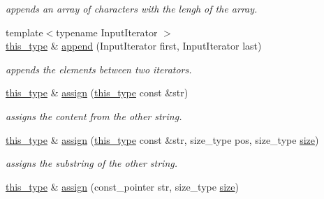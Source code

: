 \begin{DoxyCompactItemize}
\begin{DoxyCompactList}\small\item\em appends an array of characters with the lengh of the array. \end{DoxyCompactList}\item 
\hypertarget{classhryky_1_1_string_a6ef06ff34990a702f16c422d8080e40d}{{\footnotesize template$<$typename Input\-Iterator $>$ }\\\hyperlink{classhryky_1_1_string}{this\-\_\-type} \& \hyperlink{classhryky_1_1_string_a6ef06ff34990a702f16c422d8080e40d}{append} (Input\-Iterator first, Input\-Iterator last)}\label{classhryky_1_1_string_a6ef06ff34990a702f16c422d8080e40d}

\begin{DoxyCompactList}\small\item\em appends the elements between two iterators. \end{DoxyCompactList}\item 
\hypertarget{classhryky_1_1_string_a7bf5bd2385beb66a4d7d034eae00b9b1}{\hyperlink{classhryky_1_1_string}{this\-\_\-type} \& \hyperlink{classhryky_1_1_string_a7bf5bd2385beb66a4d7d034eae00b9b1}{assign} (\hyperlink{classhryky_1_1_string}{this\-\_\-type} const \&str)}\label{classhryky_1_1_string_a7bf5bd2385beb66a4d7d034eae00b9b1}

\begin{DoxyCompactList}\small\item\em assigns the content from the other string. \end{DoxyCompactList}\item 
\hypertarget{classhryky_1_1_string_a15549f6cd3f2a7957fc4d09d2ee1a346}{\hyperlink{classhryky_1_1_string}{this\-\_\-type} \& \hyperlink{classhryky_1_1_string_a15549f6cd3f2a7957fc4d09d2ee1a346}{assign} (\hyperlink{classhryky_1_1_string}{this\-\_\-type} const \&str, size\-\_\-type pos, size\-\_\-type \hyperlink{classhryky_1_1_string_a9db0f71dce7b2de86a54ab5323759265}{size})}\label{classhryky_1_1_string_a15549f6cd3f2a7957fc4d09d2ee1a346}

\begin{DoxyCompactList}\small\item\em assigns the substring of the other string. \end{DoxyCompactList}\item 
\hypertarget{classhryky_1_1_string_a566ec0f2ab898625ae1a575a5b25c55a}{\hyperlink{classhryky_1_1_string}{this\-\_\-type} \& \hyperlink{classhryky_1_1_string_a566ec0f2ab898625ae1a575a5b25c55a}{assign} (const\-\_\-pointer str, size\-\_\-type \hyperlink{classhryky_1_1_string_a9db0f71dce7b2de86a54ab5323759265}{size})}\label{classhryky_1_1_string_a566ec0f2ab898625ae1a575a5b25c55a}


\end{DoxyCompactItemize}
